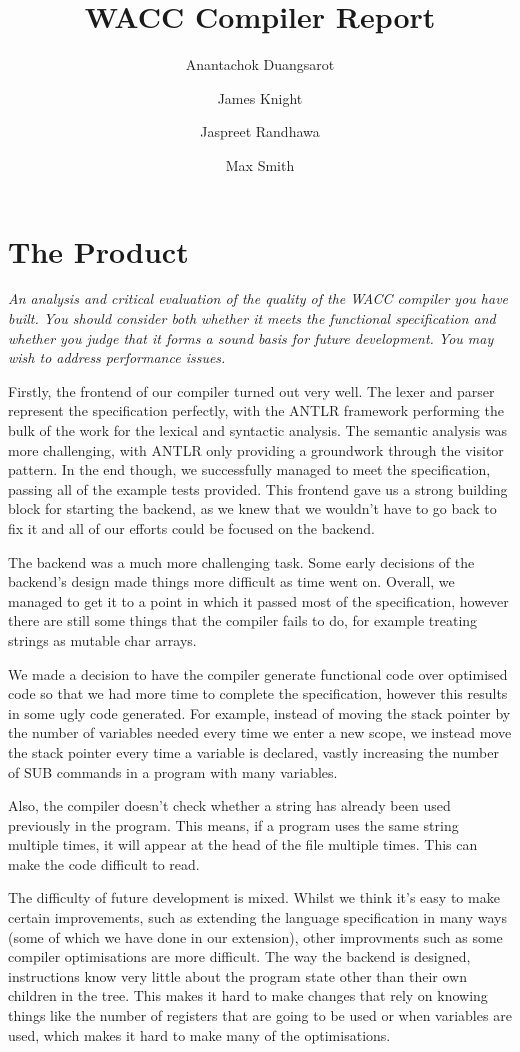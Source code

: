 \documentclass[]{article}
\date{\displaydate{date}}
\title{WACC Compiler Report}
\author{
	Anantachok Duangsarot \\
	\and
	James Knight \\
	\and
	Jaspreet Randhawa \\
	\and
	Max Smith \\
}
\newcommand{\spec}[1]{\textit{#1}\par\noindent}
\begin{document}
\maketitle

\section{The Product}
\spec{An analysis and critical evaluation of the quality of the WACC compiler you have built. You should consider both whether it meets the functional specification and whether you judge that it forms a sound basis for future development. You may wish to address performance issues.}
Firstly, the frontend of our compiler turned out very well. The lexer and parser represent the specification perfectly, with the ANTLR framework performing the bulk of the work for the lexical and syntactic analysis. The semantic analysis was more challenging, with ANTLR only providing a groundwork through the visitor pattern. In the end though, we successfully managed to meet the specification, passing all of the example tests provided. This frontend gave us a strong building block for starting the backend, as we knew that we wouldn't have to go back to fix it and all of our efforts could be focused on the backend.

The backend was a much more challenging task. Some early decisions of the backend's design made things more difficult as time went on. Overall, we managed to get it to a point in which it passed most of the specification, however there are still some things that the compiler fails to do, for example treating strings as mutable char arrays.

We made a decision to have the compiler generate functional code over optimised code so that we had more time to complete the specification, however this results in some ugly code generated. For example, instead of moving the stack pointer by the number of variables needed every time we enter a new scope, we instead move the stack pointer every time a variable is declared, vastly increasing the number of SUB commands in a program with many variables.

Also, the compiler doesn't check whether a string has already been used previously in the program. This means, if a program uses the same string multiple times, it will appear at the head of the file multiple times. This can make the code difficult to read.

The difficulty of future development is mixed. Whilst we think it's easy to make certain improvements, such as extending the language specification in many ways (some of which we have done in our extension), other improvments such as some compiler optimisations are more difficult. The way the backend is designed, instructions know very little about the program state other than their own children in the tree. This makes it hard to make changes that rely on knowing things like the number of registers that are going to be used or when variables are used, which makes it hard to make many of the optimisations.
\end{document}
